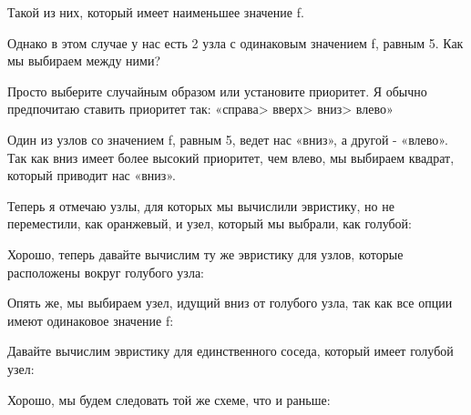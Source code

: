 Такой из них, который имеет наименьшее значение f. 

\vspace{\baselineskip}

Однако в этом случае у нас есть 2 узла с одинаковым значением f, равным 5. Как мы выбираем между ними? 

\vspace{\baselineskip}

Просто выберите случайным образом или установите приоритет. Я обычно предпочитаю ставить приоритет так: «справа> вверх> вниз> влево» 

\vspace{\baselineskip}

Один из узлов со значением f, равным 5, ведет нас «вниз», а другой - «влево». Так как вниз имеет более высокий приоритет, чем влево, мы выбираем квадрат, который приводит нас «вниз».

\vspace{\baselineskip}

Теперь я отмечаю узлы, для которых мы вычислили эвристику, но не переместили, как оранжевый, и узел, который мы выбрали, как голубой:

\vspace{\baselineskip}


Хорошо, теперь давайте вычислим ту же эвристику для узлов, которые расположены вокруг голубого узла:

\vspace{\baselineskip}


Опять же, мы выбираем узел, идущий вниз от голубого узла, так как все опции имеют одинаковое значение f:

\vspace{\baselineskip}


Давайте вычислим эвристику для единственного соседа, который имеет голубой узел: \

\vspace{\baselineskip}


Хорошо, мы будем следовать той же схеме, что и раньше:

\vspace{\baselineskip}


